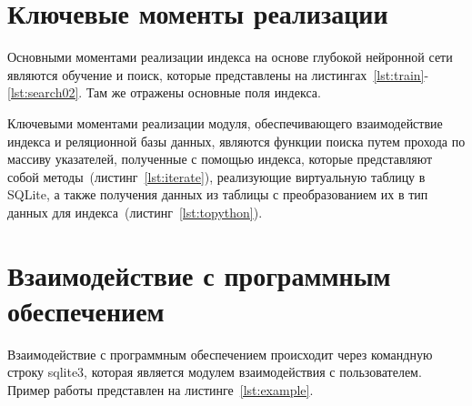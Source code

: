 \section{Ключевые моменты реализации}

Основными моментами реализации индекса на основе глубокой нейронной сети
являются обучение и поиск, которые представлены на
листингах~\ref{lst:train}-\ref{lst:search02}. Там же отражены основные поля
индекса.

{
\captionsetup{format=hang,justification=raggedright,
              singlelinecheck=off,width=16cm}
}

{
\captionsetup{format=hang,justification=raggedright,
              singlelinecheck=off,width=16cm}
}

{
\captionsetup{format=hang,justification=raggedright,
              singlelinecheck=off,width=16cm}
}

Ключевыми моментами реализации модуля, обеспечивающего взаимодействие индекса и
реляционной базы данных, являются функции поиска путем прохода по массиву
указателей, полученные с помощью индекса, которые представляют собой
методы~(листинг~\ref{lst:iterate}), реализующие виртуальную таблицу в SQLite, а
также получения данных из таблицы с преобразованием их в тип данных для
индекса~(листинг~\ref{lst:topython}).

{
\captionsetup{format=hang,justification=raggedright,
              singlelinecheck=off,width=16cm}
}

{
\captionsetup{format=hang,justification=raggedright,
              singlelinecheck=off,width=16cm}
}

\section{Взаимодействие с программным обеспечением}

Взаимодействие с программным обеспечением происходит через командную строку
sqlite3, которая является модулем взаимодействия с пользователем. Пример работы
представлен на листинге~\ref{lst:example}.

{
\captionsetup{format=hang,justification=raggedright,
              singlelinecheck=off,width=16cm}
}

~\\
~\\
~\\
~\\
~\\
~\\
~\\
~\\
~\\
~\\
~\\
~\\

